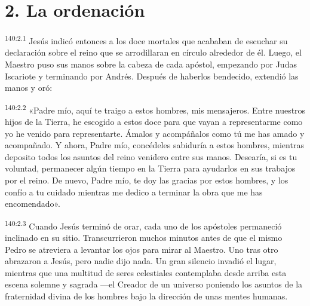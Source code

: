 \section*{2. La ordenación}
\par
\textsuperscript{140:2.1} Jesús indicó entonces a los doce mortales que acababan de escuchar su declaración sobre el reino que se arrodillaran en círculo alrededor de él. Luego, el Maestro puso sus manos sobre la cabeza de cada apóstol, empezando por Judas Iscariote y terminando por Andrés. Después de haberlos bendecido, extendió las manos y oró:

\par
\textsuperscript{140:2.2} «Padre mío, aquí te traigo a estos hombres, mis mensajeros. Entre nuestros hijos de la Tierra, he escogido a estos doce para que vayan a representarme como yo he venido para representarte. Ámalos y acompáñalos como tú me has amado y acompañado. Y ahora, Padre mío, concédeles sabiduría a estos hombres, mientras deposito todos los asuntos del reino venidero entre sus manos. Desearía, si es tu voluntad, permanecer algún tiempo en la Tierra para ayudarlos en sus trabajos por el reino. De nuevo, Padre mío, te doy las gracias por estos hombres, y los confío a tu cuidado mientras me dedico a terminar la obra que me has encomendado».

\par
\textsuperscript{140:2.3} Cuando Jesús terminó de orar, cada uno de los apóstoles permaneció inclinado en su sitio. Transcurrieron muchos minutos antes de que el mismo Pedro se atreviera a levantar los ojos para mirar al Maestro. Uno tras otro abrazaron a Jesús, pero nadie dijo nada. Un gran silencio invadió el lugar, mientras que una multitud de seres celestiales contemplaba desde arriba esta escena solemne y sagrada ---el Creador de un universo poniendo los asuntos de la fraternidad divina de los hombres bajo la dirección de unas mentes humanas.

